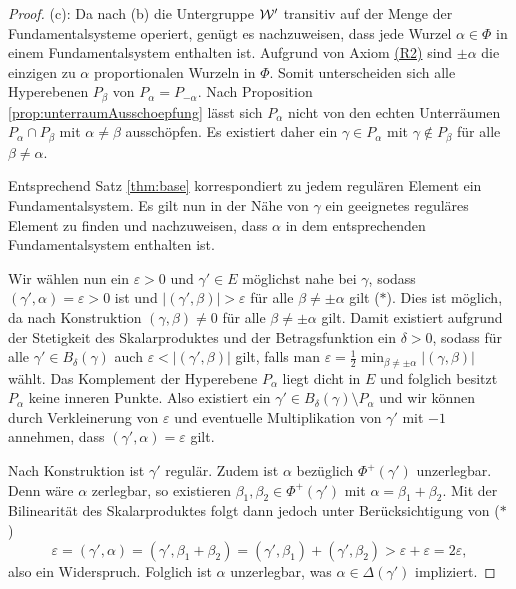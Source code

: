 \begin{proof}
  (c):
  Da nach (b) die Untergruppe $\mathcal{W}'$ transitiv auf der Menge der Fundamentalsysteme operiert, genügt es nachzuweisen, dass jede Wurzel $\alpha \in \Phi$ in einem Fundamentalsystem enthalten ist.
  Aufgrund von Axiom \hyperref[it:R2]{(R2)} sind $\pm \alpha$ die einzigen zu $\alpha$ proportionalen Wurzeln in $\Phi$.
  Somit unterscheiden sich alle Hyperebenen $P_\beta$ von $P_\alpha = P_{-\alpha}$.
  Nach Proposition \ref{prop:unterraumAusschoepfung} lässt sich $P_\alpha$ nicht von den echten Unterräumen $P_\alpha \cap P_\beta$ mit $\alpha \neq \beta$ ausschöpfen.
  Es existiert daher ein $\gamma \in P_\alpha$ mit $\gamma \not\in P_\beta$ für alle $\beta \neq \alpha$.

  Entsprechend Satz \ref{thm:base} korrespondiert zu jedem regulären Element ein Fundamentalsystem. 
  Es gilt nun in der Nähe von $\gamma$ ein geeignetes reguläres Element zu finden und nachzuweisen, dass $\alpha$ in dem entsprechenden Fundamentalsystem enthalten ist.

  Wir wählen nun ein $\varepsilon > 0$ und $\gamma' \in E$ möglichst nahe bei $\gamma$, sodass $(\gamma', \alpha) = \varepsilon > 0$ ist und $|(\gamma', \beta)| > \varepsilon$ für alle $\beta \neq \pm \alpha$ gilt ($\ast$).
  Dies ist möglich, da nach Konstruktion $(\gamma, \beta) \neq 0$ für alle $\beta \neq \pm \alpha$ gilt.
  Damit existiert aufgrund der Stetigkeit des Skalarproduktes und der Betragsfunktion ein $\delta > 0$, sodass für alle $\gamma' \in B_\delta(\gamma)$ auch $\varepsilon < |(\gamma', \beta)|$ gilt, falls man $\varepsilon = \tfrac{1}{2} \min_{\beta \neq \pm\alpha}{|(\gamma,\beta)|}$ wählt.
  Das Komplement der Hyperebene $P_\alpha$ liegt dicht in $E$ und folglich besitzt $P_\alpha$ keine inneren Punkte.
  Also existiert ein $\gamma' \in B_\delta(\gamma) \setminus P_\alpha$ und wir können durch Verkleinerung von $\varepsilon$ und eventuelle Multiplikation von $\gamma'$ mit $-1$ annehmen, dass $(\gamma', \alpha) = \varepsilon$ gilt.

  Nach Konstruktion ist $\gamma'$ regulär.
  Zudem ist $\alpha$ bezüglich $\Phi^+(\gamma')$ unzerlegbar.
  Denn wäre $\alpha$ zerlegbar, so existieren $\beta_1, \beta_2 \in \Phi^+(\gamma')$ mit $\alpha = \beta_1 + \beta_2$.
  Mit der Bilinearität des Skalarproduktes folgt dann jedoch unter Berücksichtigung von ($\ast$)
  \begin{displaymath}
    \varepsilon 
    = (\gamma', \alpha) 
    = (\gamma', \beta_1 + \beta_2) 
    = (\gamma', \beta_1) + (\gamma', \beta_2)
    > \varepsilon + \varepsilon
    = 2\varepsilon,
  \end{displaymath}
  also ein Widerspruch.
  Folglich ist $\alpha$ unzerlegbar, was $\alpha \in \Delta(\gamma')$ impliziert.


\end{proof}
